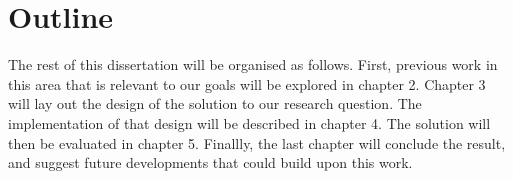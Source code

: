 \section{Outline}

The rest of this dissertation will be organised as follows. First, previous work in this area that is relevant to our goals will be explored in chapter 2. Chapter 3 will lay out the design of the solution to our research question. The implementation of that design will be described in chapter 4. The solution will then be evaluated in chapter 5. Finallly, the last chapter will conclude the result, and suggest future developments that could build upon this work.